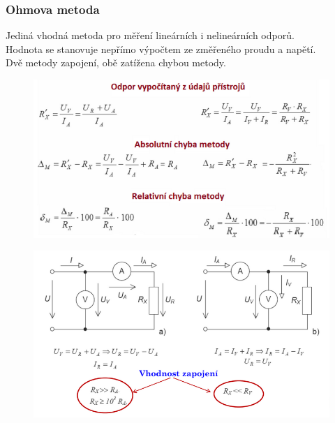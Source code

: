 \subsubsection{Ohmova metoda}
Jediná vhodná metoda pro měření lineárních i nelineárních odporů.\\
Hodnota se stanovuje nepřímo výpočtem ze změřeného proudu a napětí.\\
Dvě metody zapojení, obě zatížena chybou metody.\\
\begin{figure}[h!]
    \centering
    \includegraphics[scale = 0.5]{images/Ohm1.png}
\end{figure}
\begin{figure}[h!]
    \centering
    \includegraphics[scale = 0.5]{images/Ohm2.png}
\end{figure}

